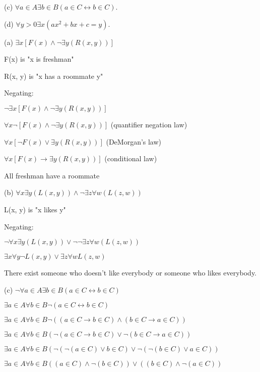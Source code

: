 \documentclass{article}
\begin{document}
\hspace{12pt}(c) $\forall a \in A \exists b \in B(a \in C \leftrightarrow b \in C)$.

\hspace{12pt}(d) $\forall y > 0 \exists x(ax^2 + bx + c = y)$.
\vspace{30pt}

(a) $\exists x [F(x) \land \neg \exists y(R(x, y))]$

F(x) is "x is freshman"

R(x, y) is "x has a roommate y"

Negating:

$\neg \exists x [F(x) \land \neg \exists y(R(x, y))]$

$\forall x \neg [F(x) \land \neg \exists y(R(x, y))]$ (quantifier negation law)

$\forall x [\neg F(x) \lor \exists y(R(x,y))]$ (DeMorgan's law)

$\forall x [F(x) \to \exists y(R(x, y))]$ (conditional law)

All freshman have a roommate

\vspace{20pt}

(b) $\forall x \exists y (L(x,y)) \land \neg \exists z \forall w (L(z, w))$

L(x, y) is "x likes y"

Negating:

$\neg \forall x \exists y (L(x, y)) \lor \neg \neg \exists z \forall w (L(z, w))$

$\exists x \forall y \neg L(x, y) \lor \exists z \forall w L(z, w)$

There exist someone who doesn't like everybody or someone who likes everybody.

\vspace{20pt}

(c) $\neg \forall a \in A \exists b \in B(a \in C \leftrightarrow b \in C)$

$\exists a \in A \forall b \in B \neg (a \in C \leftrightarrow b \in C)$

$\exists a \in A \forall b \in B \neg ((a \in C \to b \in C) \land (b \in C \to a \in C))$

$\exists a \in A \forall b \in B (\neg (a \in C \to b \in C) \lor \neg (b \in C \to a \in C))$

$\exists a \in A \forall b \in B (\neg (\neg (a \in C) \lor b \in C) \lor \neg (\neg (b \in C) \lor a \in C))$

$\exists a \in A \forall b \in B ((a \in C) \land \neg (b \in C)) \lor ((b \in C) \land \neg (a \in C))$
\end{document}
